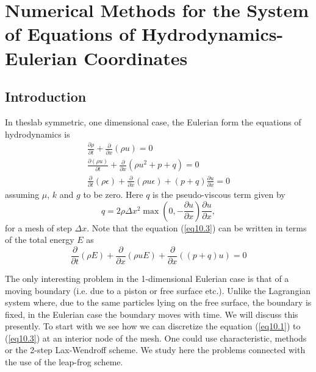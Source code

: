 
\chapter[Numerical Methods for the System of Equations
  of...]{Numerical Methods for the System of Equations of 
  Hydrodynamics-Eulerian Coordinates}\label{chap10}   

\section{Introduction}\label{chap10:sec10.1}

In the\pageoriginale slab symmetric, one dimensional case, the
Eulerian form the equations of hydrodynamics is  
\begin{gather*}
\frac{\partial \rho}{\partial t} + \frac{\partial }{\partial x} (\rho
u) = 0 \tag{10.1}\label{eq10.1}\\ 
\frac{\partial (\rho u)}{\partial t} + \frac{\partial}{\partial x}
(\rho u^2 +  p + q) = 0 \tag{10.2}\label{eq10.2}\\ 
\frac{\partial}{\partial t} (\rho \epsilon) + \frac{\partial}{\partial
  x} (\rho u \epsilon)   + (p+q) \frac{\partial u}{\partial x} =0
\tag{10.3}\label{eq10.3} 
\end{gather*}
assuming $\mu$, $k$ and $g$ to be zero. Here $q$ is the pseudo-viscous term given by
\begin{equation*}
q = 2 \rho \Delta x^2 \max \left(0, - \frac{\partial u}{\partial x}\right)
\frac{\partial u}{\partial x}, \tag{10.4}\label{eq10.4} 
\end{equation*}
for a mesh of step $\Delta x$. Note that the equation (\ref{eq10.3}) can be written in terms of the total energy $E$ as 
\begin{equation*}
\frac{\partial}{\partial t} (\rho E) + \frac{\partial}{\partial x}
(\rho uE) + \frac{\partial}{\partial x} ((p+q) u) = 0
\tag*{$(10.3')$}\label{eq10.3'}  
\end{equation*}

The only interesting problem in the 1-dimensional Eulerian case is
that of a moving boundary (i.e. due to a piston or free surface
etc.). Unlike the Lagrangian system where, due to the same particles
lying on the free surface, the boundary is fixed, in the Eulerian case
the boundary moves with time. We will discuss this presently. To start
with we see how we can discretize the equation (\ref{eq10.1}) to
(\ref{eq10.3}) at an interior node of the mesh. One could use
characteristic, methods or the 2-step Lax-Wendroff scheme. We study
here the problems connected with the use of the leap-frog scheme. 

